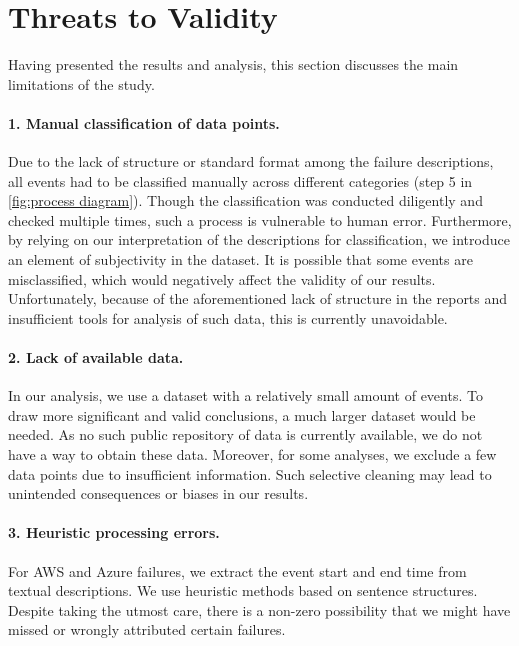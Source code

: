 \section{Threats to Validity}
Having presented the results and analysis, this section discusses the main limitations of the study.

\paragraph{1. Manual classification of data points.}
Due to the lack of structure or standard format among the failure descriptions, all events had to be classified manually across different categories (step 5 in \autoref{fig:process diagram}).
Though the classification was conducted diligently and checked multiple times, such a process is vulnerable to human error.
Furthermore, by relying on our interpretation of the descriptions for classification, we introduce an element of subjectivity in the dataset.
It is possible that some events are misclassified, which would negatively affect the validity of our results.
Unfortunately, because of the aforementioned lack of structure in the reports and insufficient tools for analysis of such data, this is currently unavoidable.

\paragraph{2. Lack of available data.}
In our analysis, we use a dataset with a relatively small amount of events.
To draw more significant and valid conclusions, a much larger dataset would be needed.
As no such public repository of data is currently available, we do not have a way to obtain these data.
Moreover, for some analyses, we exclude a few data points due to insufficient information.
Such selective cleaning may lead to unintended consequences or biases in our results.

\paragraph{3. Heuristic processing errors.}
For AWS and Azure failures, we extract the event start and end time from textual descriptions.
We use heuristic methods based on sentence structures.
Despite taking the utmost care, there is a non-zero possibility that we might have missed or wrongly attributed certain failures.
